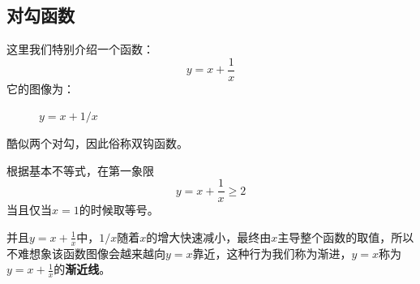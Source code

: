 \subsection{对勾函数}

这里我们特别介绍一个函数：
$$
    y=x+\frac{1}{x}
$$
它的图像为：
\begin{figure}[H]
    \centering
    \caption{$y=x+1/x$}
\end{figure}

酷似两个对勾，因此俗称双钩函数。

根据基本不等式，在第一象限
$$
    y=x+\frac{1}{x}\geq 2
$$
当且仅当$x=1$的时候取等号。

\begin{definition}[渐近线]
    并且$y=x+\frac{1}{x}$中，$1/x$随着$x$的增大快速减小，最终由$x$主导整个函数的取值，所以不难想象该函数图像会越来越向$y=x$靠近，这种行为我们称为渐进，$y=x$称为$y=x+\frac{1}{x}$的\textbf{渐近线}。
\end{definition}
